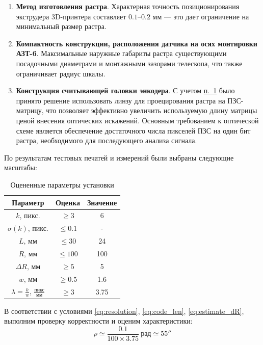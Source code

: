 \begin{enumerate}
    \item \textbf{Метод изготовления растра}\label{point_raster}. Характерная точность позиционирования экструдера 3D-принтера составляет $0.1$–$0.2$ мм --- это дает ограничение на минимальный размер растра.
    \item \textbf{Компактность конструкции, расположения датчика на осях монтировки АЗТ-6}. Максимальные наружные габариты растра существующими посадочными диаметрами и монтажными зазорами телескопа, что также ограничивает радиус шкалы.
    \item \textbf{Конструкция считывающей головки энкодера}\label{point_lense_distortion}. С учетом \hyperref[point_raster]{п.~1} было принято решение использовать линзу для проецирования растра на ПЗС-матрицу, что позволяет эффективно увеличить используемую длину матрицы ценой внесения оптических искажений. Основным требованием к оптической схеме является обеспечение достаточного числа пикселей ПЗС на один бит растра, необходимого для последующего анализа сигнала.
\end{enumerate}

По результатам тестовых печатей и измерений были выбраны следующие масштабы:
\begin{table}[H]
    \centering
    \begin{tabular}{c|c|c}
        \hline
        Параметр & Оценка & Значение \\
        \hline
        $k$, пикс. & $\geq 3$ & 6\\
        $\sigma(k)$, пикс. & $\leq 0.1$ & -\\
        $L$, мм & $\leq 30$& 24\\
        $R$, мм & $\leq 100$ & 100\\
        $\Delta R$, мм & $\geq5$ & 5\\
        $w$, мм & $\geq 0.5$ & 1.6\\
        $\lambda = \frac{k}{w}$, $\frac{\text{пикс}}{\text{мм}}$ & $\geq 3$ & 3.75\\
    \end{tabular}
    \caption{Оцененные параметры установки}
    \label{tab:work_values}
\end{table}

В соответствии с условиями \eqref{eq:resolution}, \eqref{eq:code_len}, \eqref{eq:estimate_dR}, выполним проверку корректности и оценим характеристики:
\begin{equation*}
    \rho \simeq \frac{0.1}{100\times3.75}~\text{рад} \simeq 55'' 
\end{equation*}

